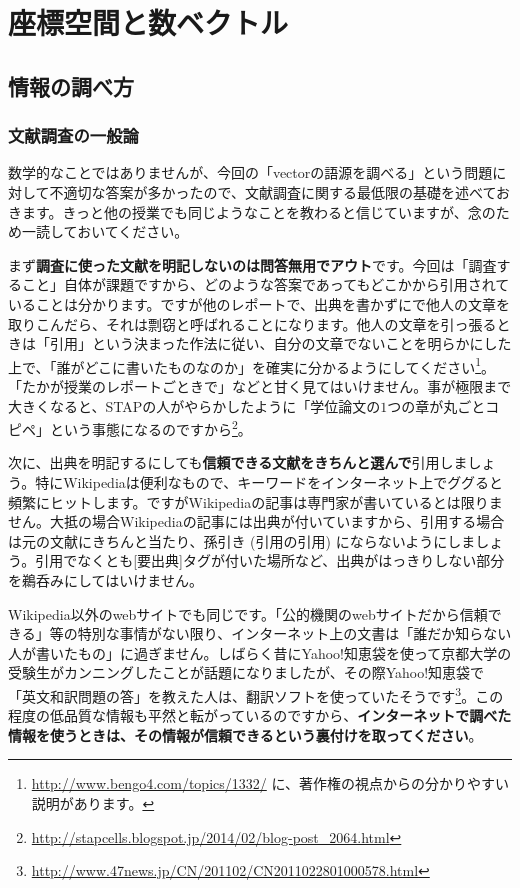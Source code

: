 \chapter{座標空間と数ベクトル}


\section{情報の調べ方}

\subsection{文献調査の一般論}

数学的なことではありませんが、今回の「vectorの語源を調べる」という問題に対して不適切な答案が多かったので、文献調査に関する最低限の基礎を述べておきます。きっと他の授業でも同じようなことを教わると信じていますが、念のため一読しておいてください。

まず\textbf{調査に使った文献を明記しないのは問答無用でアウト}です。今回は「調査すること」自体が課題ですから、どのような答案であってもどこかから引用されていることは分かります。ですが他のレポートで、出典を書かずにで他人の文章を取りこんだら、それは剽窃と呼ばれることになります。他人の文章を引っ張るときは「引用」という決まった作法に従い、自分の文章でないことを明らかにした上で、「誰がどこに書いたものなのか」を確実に分かるようにしてください\footnote{\url{http://www.bengo4.com/topics/1332/} に、著作権の視点からの分かりやすい説明があります。}。「たかが授業のレポートごときで」などと甘く見てはいけません。事が極限まで大きくなると、STAPの人がやらかしたように「学位論文の$1$つの章が丸ごとコピペ」という事態になるのですから\footnote{\url{http://stapcells.blogspot.jp/2014/02/blog-post_2064.html}}。

次に、出典を明記するにしても\textbf{信頼できる文献をきちんと選んで}引用しましょう。特にWikipediaは便利なもので、キーワードをインターネット上でググると頻繁にヒットします。ですがWikipediaの記事は専門家が書いているとは限りません。大抵の場合Wikipediaの記事には出典が付いていますから、引用する場合は元の文献にきちんと当たり、孫引き (引用の引用) にならないようにしましょう。引用でなくとも[要出典]タグが付いた場所など、出典がはっきりしない部分を鵜呑みにしてはいけません。

Wikipedia以外のwebサイトでも同じです。「公的機関のwebサイトだから信頼できる」等の特別な事情がない限り、インターネット上の文書は「誰だか知らない人が書いたもの」に過ぎません。しばらく昔にYahoo!知恵袋を使って京都大学の受験生がカンニングしたことが話題になりましたが、その際Yahoo!知恵袋で「英文和訳問題の答」を教えた人は、翻訳ソフトを使っていたそうです\footnote{\url{http://www.47news.jp/CN/201102/CN2011022801000578.html}}。この程度の低品質な情報も平然と転がっているのですから、\textbf{インターネットで調べた情報を使うときは、その情報が信頼できるという裏付けを取ってください}。

